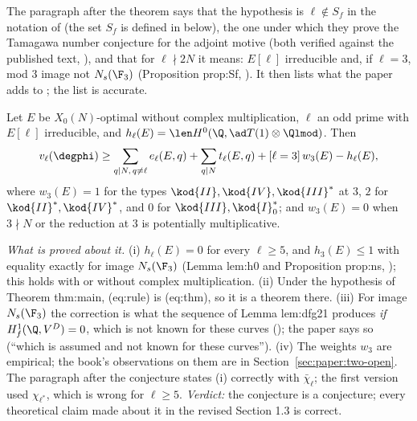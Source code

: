 \begin{sloppypar}
The paragraph after the theorem says that the hypothesis is $\ell\notin S_f$ in the notation of \cite[(31)]{DFG04} (the set $S_f$ is defined in
 below), the one under which they prove the
Tamagawa number conjecture for the adjoint motive \cite[Theorem 0.1]{DFG04} (both verified against the published text, ), and that for
$\ell\nmid2N$ it means: $E[\ell]$ irreducible and, if $\ell=3$, mod $3$ image not $N_s(\F_3)$ (Proposition prop:Sf, ). It then lists what the
paper adds to \cite{DFG04}; the list is accurate.

\begin{conjecture}\label{conj:paper:euler}
Let $E$ be $X_0(N)$-optimal without complex multiplication, $\ell$ an odd prime with $E[\ell]$ irreducible, and $h_\ell(E)=\len H^0(\Q,\ad T(1)\otimes\Qlmod)$. Then
\begin{equation}\label{eq:paper:rule}
v_\ell(\degphi)\ge\sum_{q\mid N,\,q\ne\ell}e_\ell(E,q)+\sum_{q\mid N}t_\ell(E,q)+[\ell=3]\,w_3(E)-h_\ell(E),
\end{equation}
where $w_3(E)=1$ for the types $\kod{II},\kod{IV},\kod{III}^*$ at $3$, $2$ for $\kod{II}^*,\kod{IV}^*$, and $0$ for $\kod{III},\kod{I}_0^*$; and $w_3(E)=0$ when $3\nmid N$ or the reduction at $3$ is potentially
multiplicative.
\end{conjecture}

\noindent\emph{What is proved about it.} (i) $h_\ell(E)=0$ for every $\ell\ge5$, and $h_3(E)\le1$ with equality exactly for image $N_s(\F_3)$ (Lemma lem:h0 and Proposition
prop:ns, ); this holds with or without complex multiplication. (ii) Under the hypothesis of Theorem thm:main, (eq:rule) is
(eq:thm), so it is a theorem there. (iii) For image $N_s(\F_3)$ the correction is what the sequence of Lemma lem:dfg21 produces \emph{if}
$H^1_f(\Q,V^D)=0$, which is not known for these curves (); the paper says so (``which is assumed and not known for these
curves''). (iv) The weights $w_3$ are empirical; the book's observations on them are in Section~\ref{sec:paper:two-open}. The paragraph after the
conjecture states (i) correctly with $\bar\chi_\ell$; the first version used $\chi_{\ell^*}$, which is wrong for $\ell\ge5$. \emph{Verdict:} the conjecture is a conjecture;
every theoretical claim made about it in the revised Section 1.3 is correct.


\end{sloppypar}
